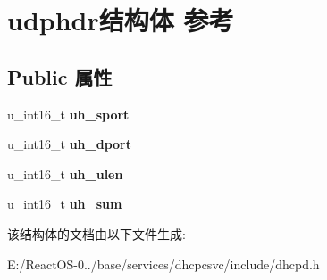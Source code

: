 \hypertarget{structudphdr}{}\section{udphdr结构体 参考}
\label{structudphdr}
\subsection*{Public 属性}
\begin{DoxyCompactItemize}
\item 
\mbox{\label{structudphdr_ab4c0a0878f22ab57e5e203b7f4496f01}} 
u\+\_\+int16\+\_\+t {\bfseries uh\+\_\+sport}
\item 
\mbox{\label{structudphdr_a717e032d2b34025297d3078f05407efd}} 
u\+\_\+int16\+\_\+t {\bfseries uh\+\_\+dport}
\item 
\mbox{\label{structudphdr_accabf57f60185986f873fd309e4a4f16}} 
u\+\_\+int16\+\_\+t {\bfseries uh\+\_\+ulen}
\item 
\mbox{\label{structudphdr_af567db164c1a67466da85d4b95fd75a1}} 
u\+\_\+int16\+\_\+t {\bfseries uh\+\_\+sum}
\end{DoxyCompactItemize}


该结构体的文档由以下文件生成\+:\begin{DoxyCompactItemize}
\item 
E\+:/\+React\+O\+S-\/0../base/services/dhcpcsvc/include/dhcpd.\+h\end{DoxyCompactItemize}
